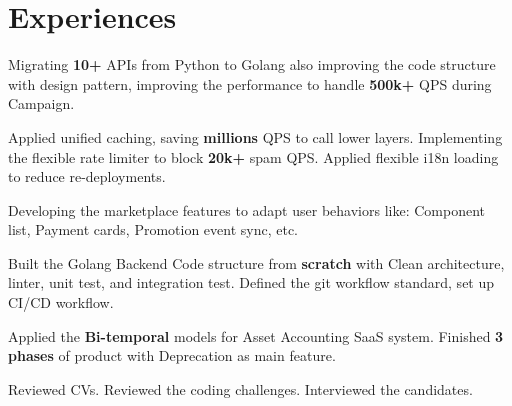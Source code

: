 \documentclass[]{deedy-resume-openfont}
\begin{document}
\begin{minipage}[t]{0.69\textwidth} 


\section{Experiences}
\vspace{\topsep} %
\begin{tightemize}
\item Migrating \textbf{10+} APIs from Python to Golang also improving the code structure with design pattern, improving the performance to handle  \textbf{500k+} QPS during Campaign.
\item Applied unified caching, saving  \textbf{millions} QPS to call lower layers. Implementing the flexible rate limiter to block \textbf{20k+} spam QPS. Applied flexible i18n loading to reduce re-deployments.
\item Developing the marketplace features to adapt user behaviors like: Component list, Payment cards, Promotion event sync, etc.
\end{tightemize}
\sectionsep

\vspace{\topsep} %
\begin{tightemize}
\item Built the Golang Backend Code structure from \textbf{scratch} with Clean architecture, linter, unit test, and integration test. Defined the git workflow standard, set up CI/CD workflow. 
\item Applied the  \textbf{Bi-temporal} models for Asset Accounting SaaS system. Finished \textbf{3 phases} of product with Deprecation as main feature.
\item Reviewed CVs. Reviewed the coding challenges. Interviewed the candidates.
\end{tightemize}
\sectionsep


\end{minipage}
\end{document}
